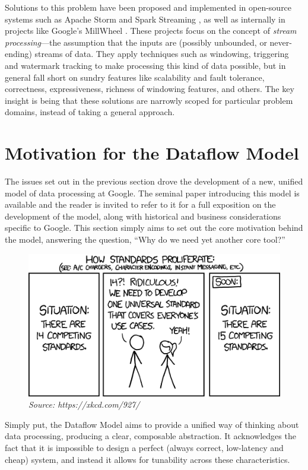 Solutions to this problem have been proposed and implemented in open-source systems such as Apache Storm \cite{apache_storm} and Spark Streaming \cite{spark:zaharia2013discretized}, as well as internally in projects like Google's MillWheel \cite{akidau2013millwheel}.
These projects focus on the concept of \emph{stream processing}---the assumption that the inputs are (possibly unbounded, or never-ending) streams of data.
They apply techniques such as windowing, triggering and watermark tracking to make processing this kind of data possible, but in general fall short on sundry features like scalability and fault tolerance, correctness, expressiveness, richness of windowing features, and others.
The key insight is being that these solutions are narrowly scoped for particular problem domains, instead of taking a general approach.

\section{Motivation for the Dataflow Model}\label{sec:intro:motivation}

The issues set out in the previous section drove the development of a new, unified model of data processing at Google.
The seminal paper introducing this model is available \cite{Akidau:2015} and the reader is invited to refer to it for a full exposition on the development of the model, along with historical and business considerations specific to Google.
This section simply aims to set out the core motivation behind the model, answering the question, ``Why do we need yet another core tool?''

\begin{figure}[h]
	\centering
	\includegraphics[width=.75\textwidth]{images/xkcd-standards}
	\caption*{\textit{Source: https://xkcd.com/927/}}
\end{figure}

Simply put, the Dataflow Model aims to provide a unified way of thinking about data processing, producing a clear, composable abstraction.
It acknowledges the fact that it is impossible to design a perfect (always correct, low-latency and cheap) system, and instead it allows for tunability across these characteristics.

